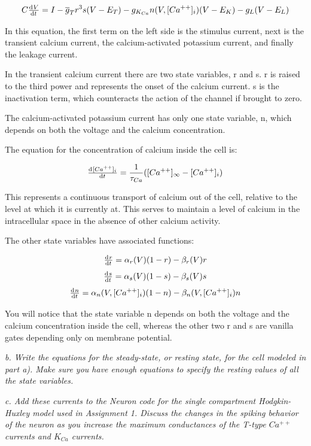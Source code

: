 \documentclass[12pt]{article}
\begin{document}
$$ C\od{V}{t}=I-\overline{g}_Tr^3s(V-E_T)-g_{K_{Ca}}n(V,[Ca^{++}]_i)(V-E_K)-g_L(V-E_L) $$

In this equation, the first term on the left side is the stimulus current, next is the transient calcium current, the calcium-activated potassium current, and finally the leakage current.  

In the transient calcium current there are two state variables, r and s.  r is raised to the third power and represents the onset of the calcium current.  s is the inactivation term, which counteracts the action of the channel if brought to zero.

The calcium-activated potassium current has only one state variable, n, which depends on both the voltage and the calcium concentration.  

The equation for the concentration of calcium inside the cell is:

$$ \od{[Ca^{++}]_i}{t}=\frac{1}{\tau_{Ca}}([Ca^{++}]_{\infty}-[Ca^{++}]_i) $$

This represents a continuous transport of calcium out of the cell, relative to the level at which it is currently at.  This serves to maintain a level of calcium in the intracellular space in the absence of other calcium activity.  

The other state variables have associated functions:

$$ \od{r}{t}=\alpha_r(V)(1-r)-\beta_r(V)r $$
$$ \od{s}{t}=\alpha_s(V)(1-s)-\beta_s(V)s $$
$$ \od{n}{t}=\alpha_n(V,[Ca^{++}]_i)(1-n)-\beta_n(V,[Ca^{++}]_i)n $$

You will notice that the state variable n depends on both the voltage and the calcium concentration inside the cell, whereas the other two r and s are vanilla gates depending only on membrane potential.

\vspace{10pt}

\emph{b.  Write the equations for the steady-state, or resting state, for the cell modeled in part a). Make sure you have enough equations to specify the resting values of all the state variables.}

\vspace{10pt}



\vspace{10pt}

\emph{c.  Add these currents to the Neuron code for the single compartment Hodgkin-Huxley model used in Assignment 1. Discuss the changes in the spiking behavior of the neuron as you increase the maximum conductances of the T-type $Ca^{++}$ currents and $K_{Ca}$ currents.}
\end{document}
